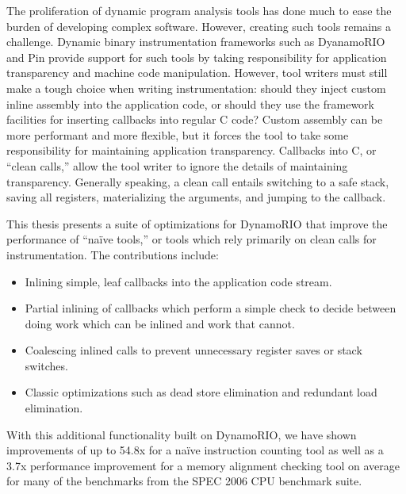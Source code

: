 \begin{abstractpage}

The proliferation of dynamic program analysis tools has done much to ease the
burden of developing complex software.  However, creating such tools remains a
challenge.  Dynamic binary instrumentation frameworks such as DyanamoRIO and
Pin provide support for such tools by taking responsibility for application
transparency and machine code manipulation.  However, tool writers must still
make a tough choice when writing instrumentation: should they inject custom
inline assembly into the application code, or should they use the framework
facilities for inserting callbacks into regular C code?  Custom assembly can be
more performant and more flexible, but it forces the tool to take some
responsibility for maintaining application transparency.  Callbacks into C, or
``clean calls,'' allow the tool writer to ignore the details of maintaining
transparency.  Generally speaking, a clean call entails switching to a safe
stack, saving all registers, materializing the arguments, and jumping to the
callback.


This thesis presents a suite of optimizations for DynamoRIO that improve the
performance of ``na\"ive tools,'' or tools which rely primarily on clean calls
for instrumentation.  The contributions include:

\begin{itemize}
\item Inlining simple, leaf callbacks into the application code stream.
\item Partial inlining of callbacks which perform a simple check to decide
between doing work which can be inlined and work that cannot.
\item Coalescing inlined calls to prevent unnecessary register saves or stack
switches.
\item Classic optimizations such as dead store elimination and redundant load
elimination.
\end{itemize}

With this additional functionality built on DynamoRIO, we have shown
improvements of up to 54.8x for a na\"ive instruction counting tool as well as a
3.7x performance improvement for a memory alignment checking tool on average for
many of the benchmarks from the SPEC 2006 CPU benchmark suite.

\end{abstractpage}
